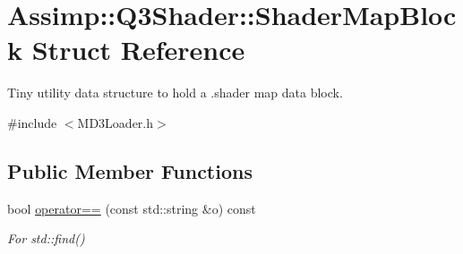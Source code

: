 \hypertarget{struct_assimp_1_1_q3_shader_1_1_shader_map_block}{\section{Assimp\+:\+:Q3\+Shader\+:\+:Shader\+Map\+Block Struct Reference}
\label{struct_assimp_1_1_q3_shader_1_1_shader_map_block}
}


Tiny utility data structure to hold a .shader map data block.  




{\ttfamily \#include $<$M\+D3\+Loader.\+h$>$}

\subsection*{Public Member Functions}
\begin{DoxyCompactItemize}
\item 
\hypertarget{struct_assimp_1_1_q3_shader_1_1_shader_map_block_aa074aea6e35c71dcb2b37be3027c5bfc}{bool \hyperlink{struct_assimp_1_1_q3_shader_1_1_shader_map_block_aa074aea6e35c71dcb2b37be3027c5bfc}{operator==} (const std\+::string \&o) const }\label{struct_assimp_1_1_q3_shader_1_1_shader_map_block_aa074aea6e35c71dcb2b37be3027c5bfc}

\begin{DoxyCompactList}\small\item\em For std\+::find() \end{DoxyCompactList}\end{DoxyCompactItemize}
